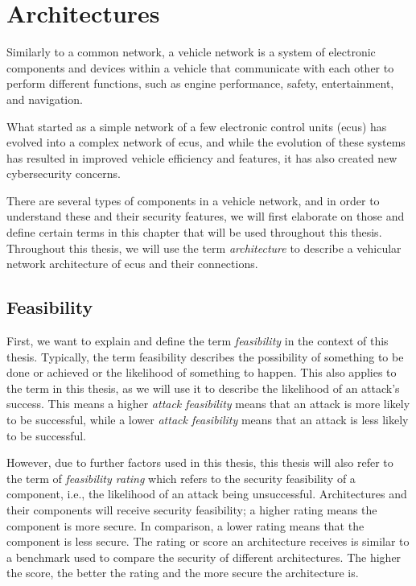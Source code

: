 \chapter{Architectures}
\label{chp:arch}

Similarly to a common network, a vehicle network is a system of electronic components and devices within a vehicle 
that communicate with each other to perform different functions, such as engine performance, safety, entertainment, and navigation. 

What started as a simple network of a few electronic control units (\acrshort{ecu}s) has evolved into a complex network of \acrshort{ecu}s,
and while the evolution of these systems has resulted in improved vehicle efficiency and features, 
it has also created new cybersecurity concerns.

There are several types of components in a vehicle network, and in order to understand these and their security features,
we will first elaborate on those and define certain terms in this chapter that will be used throughout this thesis.
Throughout this thesis, we will use the term \textit{architecture} to describe a vehicular network architecture of \acrshort{ecu}s and their connections.

\section{Feasibility}
\label{def:feasibility}

First, we want to explain and define the term \textit{feasibility} in the context of this thesis.
Typically, the term feasibility describes the possibility of something to be done or achieved or the likelihood of something to happen.
This also applies to the term in this thesis, as we will use it to describe the likelihood of an attack's success.
This means a higher \textit{attack feasibility} means that an attack is more likely to be successful, while a lower \textit{attack feasibility} means that an attack is less likely to be successful.

However, due to further factors used in this thesis, this thesis will also refer to the term of \textit{feasibility rating}
which refers to the security feasibility of a component, i.e., the likelihood of an attack being unsuccessful.
Architectures and their components will receive security feasibility; a higher rating means the component is more secure. In comparison, a lower rating means that the component is less secure.
The rating or score an architecture receives is similar to a benchmark used to compare the security of different architectures.
The higher the score, the better the rating and the more secure the architecture is.

